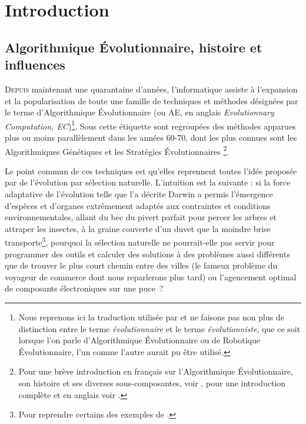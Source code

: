  \chapter*{Introduction}
\section*{Algorithmique Évolutionnaire, histoire et influences}\label{sec:intro:ae}

\lettrine[lines=2]{D}{epuis} maintenant une quarantaine d'années, l'informatique assiste à l'expansion et la popularisation de toute une famille de techniques et méthodes désignées par le terme d'Algorithmique Évolutionnaire (ou AE, en anglais \emph{Evolutionnary Computation, EC})\footnote{Nous reprenons ici la traduction utilisée par \cite{schoenauer09lesalgorithmesevolutionnaires} et ne faisons pas non plus de distinction entre le terme \emph{évolutionnaire} et le terme \emph{évolutionniste}, que ce soit lorsque l'on parle d'Algorithmique Évolutionnaire ou de Robotique \'Evolutionnaire, l'un comme l'autre aurait pu être utilisé.}.
Sous cette étiquette sont regroupées des méthodes apparues plus ou moins parallèlement dans les années 60-70, dont les plus connues sont les Algorithmiques Génétiques \citep{holland75adaptationnaturalartificialsystem} et les Stratégies Évolutionnaires \citep{rechenberg73evolutionsstrategieoptimierungtechnischersystemenachprinzipienderbiologischenevolution}\footnote{Pour une brève introduction en français sur l'Algorithmique Évolutionnaire, son histoire et ses diverses sous-composantes, voir \citet{schoenauer09lesalgorithmesevolutionnaires}, pour une introduction complète et en anglais voir \citet{eiben03introductiontoevolutionarycomputing}.}.

Le point commun de ces techniques est qu'elles reprennent toutes l'idée proposée par \citet{darwin1859originspeciesbymeansnaturalselectionorpreservationfavouredracesstrugglelife} de l'évolution par sélection naturelle. L'intuition est la suivante : si la force adaptative de l'évolution telle que l'a décrite Darwin a permis l'émergence d'espèces et d'organes extrêmement adaptés aux contraintes et conditions environnementales, allant du bec du pivert parfait pour percer les arbres et attraper les insectes, à la graine couverte d'un duvet que la moindre brise transporte\footnote{Pour reprendre certains des exemples de \citet[ch. 3 notamment]{darwin1859originspeciesbymeansnaturalselectionorpreservationfavouredracesstrugglelife}.}, pourquoi la sélection naturelle ne pourrait-elle pas servir pour programmer des outils et calculer des solutions à des problèmes aussi différents que de trouver le plus court chemin entre des villes (le fameux problème du voyageur de commerce dont nous reparlerons plus tard) ou l'agencement optimal de composants électroniques sur une puce~?

